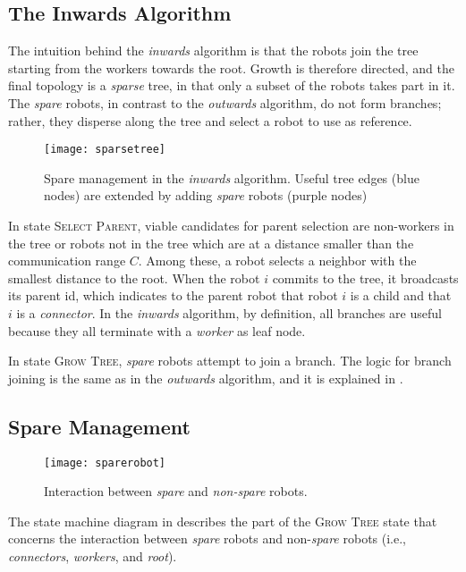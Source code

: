 \subsection{The Inwards Algorithm}
\label{sec:inwardsalg}

The intuition behind the \emph{inwards} algorithm is that the robots
join the tree starting from the workers towards the root. Growth is
therefore directed, and the final topology is a \emph{sparse} tree, in
that only a subset of the robots takes part in it. The \emph{spare}
robots, in contrast to the \emph{outwards} algorithm, do not form
branches; rather, they disperse along the tree and select a robot to
use as reference.

\begin{figure}[t]
  \centering
  \texttt{[image: sparsetree]}
  \caption{Spare management in the \emph{inwards} algorithm. Useful
    tree edges (blue nodes) are extended by adding \emph{spare} robots
    (purple nodes)}
  \label{fig:outwardsspare}
\end{figure}
In state \textsc{Select Parent}, viable candidates for parent
selection are non-workers in the tree or robots not in the tree which
are at a distance smaller than the communication range $C$. Among
these, a robot selects a neighbor with the smallest distance to the
root. When the robot $i$ commits to the tree, it broadcasts its parent
id, which indicates to the parent robot that robot $i$ is a child and
that $i$ is a \emph{connector}. In the \emph{inwards} algorithm, by
definition, all branches are useful because they all terminate with a
\emph{worker} as leaf node.

In state \textsc{Grow Tree}, \emph{spare} robots attempt to join a
branch. The logic for branch joining is the same as in the
\emph{outwards} algorithm, and it is explained in
.

\subsection{Spare Management}
\label{sec:sparemanegement}
\begin{figure}[t]
  \centering
  \texttt{[image: sparerobot]}
  \caption{Interaction between \emph{spare} and \emph{non-spare}
    robots.}
  \label{fig:sparerobot}
\end{figure}

The state machine diagram in  describes the part of
the \textsc{Grow Tree} state that concerns the interaction between
\emph{spare} robots and non-\emph{spare} robots (i.e.,
\emph{connectors}, \emph{workers}, and \emph{root}).

